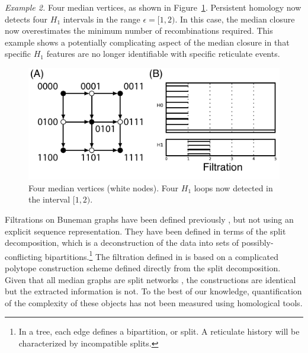 \emph{Example 2.}
Four median vertices, as shown in Figure~\ref{fig:example_2_revisited}.
Persistent homology now detects four $H_{1}$ intervals in the range $\epsilon=[1,2)$.
In this case, the median closure now overestimates the minimum number of recombinations required.
This example shows a potentially complicating aspect of the median closure in that specific $H_1$ features are no longer identifiable with specific reticulate events.

\begin{figure}
\centering
\includegraphics[width=\columnwidth]{fig/complex_construction/example_2_revisited.pdf}
\caption[The Median Complex Recovers Reticulation in Example Two]{Four median vertices (white nodes). Four $H_1$ loops now detected in the interval $[1,2)$.}
\label{fig:example_2_revisited}
\end{figure}

Filtrations on Buneman graphs have been defined previously \citep{Dress:1997}, but not using an explicit sequence representation.
They have been defined in terms of the split decomposition, which is a deconstruction of the data into sets of possibly-conflicting bipartitions.\footnote{In a tree, each edge defines a bipartition, or split. A reticulate history will be characterized by incompatible splits.}
The filtration defined in \citet{Dress:1997} is based on a complicated polytope construction scheme defined directly from the split decomposition.
Given that all median graphs are split networks \citep{Huson:2010}, the constructions are identical but the extracted information is not.
To the best of our knowledge, quantification of the complexity of these objects has not been measured using homological tools.

